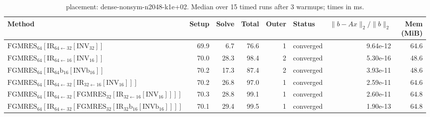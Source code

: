 \begin{table}[t]
\centering
\small
\caption{placement: dense-nonsym-n2048-k1e+02. Median over 15 timed runs after 3 warmups; times in ms.}
\label{tab:placement-dense-nonsym-n2048-k1e+02}
\begin{tabular}{lrrrrlrr}
\hline
Method & Setup & Solve & Total & Outer & Status & $\|b-Ax\|_2/\|b\|_2$ & Mem (MiB) \\
\hline
$\mathrm{FGMRES}_{64}[\mathrm{IR}_{64\leftarrow 32}[\mathrm{INV}_{32}]]$ & 69.9 & 6.7 & 76.6 & 1 & converged & 9.64e-12 & 64.6 \\
$\mathrm{FGMRES}_{64}[\mathrm{IR}_{64\leftarrow 16}[\mathrm{INV}_{16}]]$ & 70.0 & 28.3 & 98.4 & 2 & converged & 5.30e-16 & 48.6 \\
$\mathrm{FGMRES}_{64}[\mathrm{IR}_{64}{\mathrm{b}_{16}}[\mathrm{INVb}_{16}]]$ & 70.2 & 17.3 & 87.4 & 2 & converged & 3.93e-11 & 48.6 \\
$\mathrm{FGMRES}_{64}[\mathrm{IR}_{64\leftarrow 32}[\mathrm{IR}_{32\leftarrow 16}[\mathrm{INV}_{16}]]]$ & 70.2 & 26.8 & 97.0 & 1 & converged & 2.59e-11 & 64.6 \\
$\mathrm{FGMRES}_{64}[\mathrm{IR}_{64\leftarrow 32}[\mathrm{FGMRES}_{32}[\mathrm{IR}_{32\leftarrow 16}[\mathrm{INV}_{16}]]]]$ & 70.3 & 28.8 & 99.1 & 1 & converged & 2.60e-11 & 64.8 \\
$\mathrm{FGMRES}_{64}[\mathrm{IR}_{64\leftarrow 32}[\mathrm{FGMRES}_{32}[\mathrm{IR}_{32}{\mathrm{b}_{16}}[\mathrm{INVb}_{16}]]]]$ & 70.1 & 29.4 & 99.5 & 1 & converged & 1.90e-13 & 64.8 \\
\hline
\end{tabular}
\end{table}
